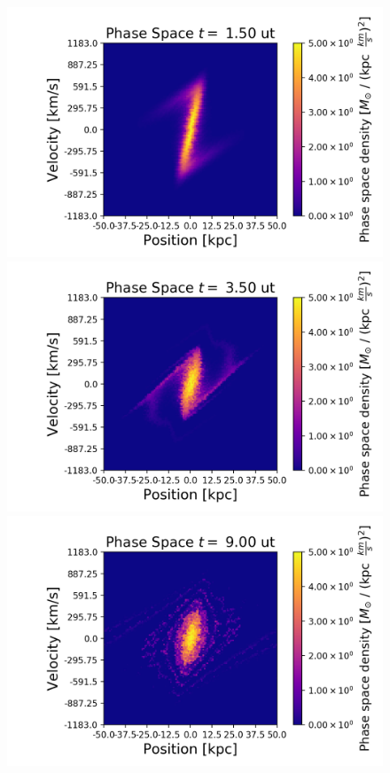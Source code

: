 \begin{figure}[h!]
    \centering
    \includegraphics[scale=0.45]{imag/2dPhase3.png}
    \includegraphics[scale=0.45]{imag/2dPhase7.png}
    \includegraphics[scale=0.45]{imag/2dPhase18.png}

\end{figure}
